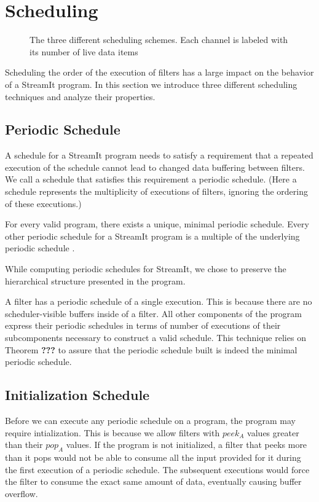 \section{Scheduling}

\begin{figure}
\centering
{}
\caption{The three different scheduling schemes.  Each channel is labeled with its number of live data items}
\label{fig:sched}

\end{figure}

Scheduling the order of the execution of filters has a large impact on 
the behavior of a StreamIt program.  In this section we introduce three
different scheduling techniques and analyze their properties.

\subsection{Periodic Schedule}
A schedule for a StreamIt program needs to satisfy a requirement that
a repeated execution of the schedule cannot lead to changed data
buffering between filters.  We call a schedule that satisfies this
requirement a periodic schedule.  (Here a schedule represents the
multiplicity of executions of filters, ignoring the ordering of these
executions.)

For every valid program, there exists a unique, minimal periodic
schedule.  Every other periodic schedule for a StreamIt program is a
multiple of the underlying periodic schedule \cite{bhat1994x3}.

While computing periodic schedules for StreamIt, we chose to preserve the
hierarchical structure presented in the program.

A filter has a periodic schedule of a single execution.  This is
because there are no scheduler-visible buffers inside of a filter.
All other components of the program express their periodic schedules
in terms of number of executions of their subcomponents necessary to
construct a valid schedule.  This technique relies on Theorem {\bf
???} to assure that the periodic schedule built is indeed the minimal
periodic schedule.

\subsection{Initialization Schedule}

Before we can execute any periodic schedule on a program, the program
may require intialization.  This is because we allow filters with
$peek_A$ values greater than their $pop_A$ values.  If the program is
not initialized, a filter that peeks more than it pops would not be
able to consume all the input provided for it during the first
execution of a periodic schedule.  The subsequent executions would
force the filter to consume the exact same amount of data, eventually
causing buffer overflow.

